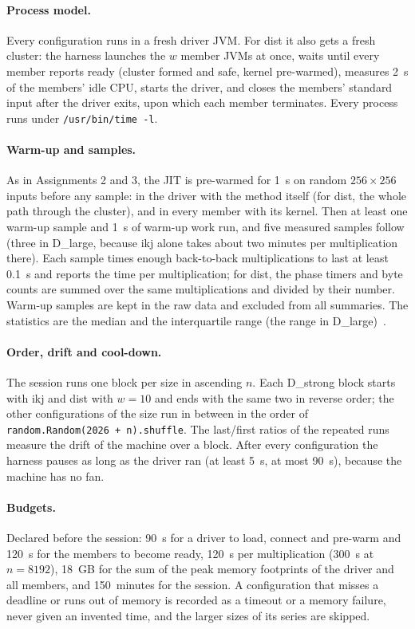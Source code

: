 \documentclass[11pt,a4paper]{article}
\begin{document}
\paragraph{Process model.} Every configuration runs in a fresh driver JVM. For
dist it also gets a fresh cluster: the harness launches the $w$ member JVMs at
once, waits until every member reports ready (cluster formed and safe, kernel
pre-warmed), measures 2~s of the members' idle CPU, starts the driver, and
closes the members' standard input after the driver exits, upon which each
member terminates. Every process runs under \texttt{/usr/bin/time -l}.

\paragraph{Warm-up and samples.} As in Assignments 2 and 3, the JIT is
pre-warmed for 1~s on random $256\times256$ inputs before any sample: in the
driver with the method itself (for dist, the whole path through the cluster),
and in every member with its kernel. Then at least one warm-up sample and 1~s
of warm-up work run, and five measured samples follow (three in D\_large,
because ikj alone takes about two minutes per multiplication there). Each
sample times enough back-to-back multiplications to last at least 0.1~s and
reports the time per multiplication; for dist, the phase timers and byte
counts are summed over the same multiplications and divided by their number.
Warm-up samples are kept in the raw data and excluded from all summaries. The
statistics are the median and the interquartile range (the range in
D\_large)~\cite{georges2007}.

\paragraph{Order, drift and cool-down.} The session runs one block per size in
ascending $n$. Each D\_strong block starts with ikj and dist with $w=10$ and
ends with the same two in reverse order; the other configurations of the size
run in between in the order of \texttt{random.Random(2026 + n).shuffle}. The
last/first ratios of the repeated runs measure the drift of the machine over a
block. After every configuration the harness pauses as long as the driver ran
(at least 5~s, at most 90~s), because the machine has no fan.

\paragraph{Budgets.} Declared before the session: 90~s for a driver to load,
connect and pre-warm and 120~s for the members to become ready, 120~s per
multiplication (300~s at $n=8192$), 18~GB for the sum of the peak memory
footprints of the driver and all members, and 150~minutes for the session. A
configuration that misses a deadline or runs out of memory is recorded as a
timeout or a memory failure, never given an invented time, and the larger sizes
of its series are skipped.
\end{document}
